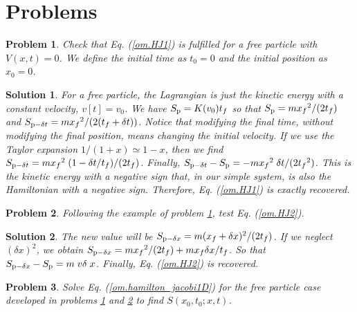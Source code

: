 \documentclass[onecolumn,nofootinbib, secnumarabic, amsmath, nobibnotes,11pt,aps,pra]{revtex4-1}
\newtheorem{problem}{Problem}
\newtheorem{solution}{Solution}
\newcommand{\eref}[1]{Eq. (\ref{#1})}
\begin{document}
\section{Problems}

\begin{problem} \label{om.p1}
Check that \eref{om.HJ1} is fulfilled for a free particle with
$V(x,t) = 0$. We define the initial time as $t_0 = 0$ and the initial
position as $x_0 = 0$.
\end{problem}

\begin{solution}
For a free particle, the Lagrangian is just the kinetic energy with
a constant velocity, $v[t] = v_0$. We have $S_{\rm p} = K(v_0) t_f$
so that $S_{\rm p} = m {x_f}^2/(2 t_f)$ and $S_{{\rm p}-\delta t} =
m {x_f}^2/( 2 (t_f + \delta t))$. Notice that modifying the final
time, without modifying the final position, means changing the
initial velocity. If we use the Taylor expansion  $1/(1 + x)\simeq
1-x$, then we find $S_{{\rm p} - \delta t} = m {x_f}^2 \; (1 -
\delta t/t_f)/(2 t_f)$. Finally, $S_{{\rm p} - \delta t} - S_{\rm p}
= -m {x_f}^2 \; \delta t/(2{t_f}^2)$. This is the kinetic energy
with a negative sign that, in our simple system, is also the
Hamiltonian with a negative sign. Therefore, \eref{om.HJ1} is
exactly recovered.
\end{solution}

\begin{problem} \label{om.p2}
Following the example of problem \ref{om.p1}, test \eref{om.HJ2}.
\end{problem}

\begin{solution}
The new value will be $S_{{\rm p} - \delta x} = m (x_f + \delta
x)^2/(2 t_f)$. If we neglect $(\delta x)^2$, we obtain $S_{{\rm
p} - \delta x} = m {x_f}^2/(2 t_f) + m {x_f} \delta x/t_f$. So that
$S_{{\rm p} - \delta x} - S_{\rm p} = m \; v \delta \; x$. Finally,
\eref{om.HJ2} is recovered.
\end{solution}


\begin{problem} \label{om.p3}
Solve \eref{om.hamilton_jacobi1D} for the free particle case developed in problems \ref{om.p1} and \ref{om.p2} to find $S(x_0,t_0;x,t)$.
\end{problem}
\end{document}

